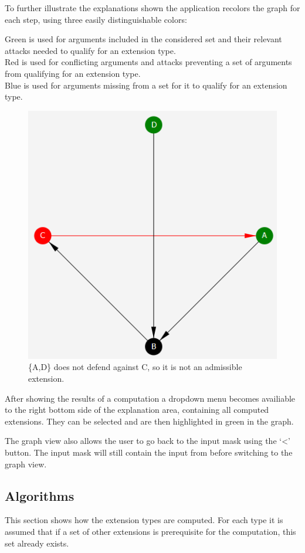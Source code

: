 \documentclass[draft,final]{vutinfth} %
\newcommand{\hl}{\par\vspace{6pt}} %
\begin{document}
To further illustrate the explanations shown the application recolors the graph for each step, using three easily distinguishable colors:\hl
Green is used for arguments included in the considered set and their relevant attacks needed to qualify for an extension type.\\
Red is used for conflicting arguments and attacks preventing a set of arguments from qualifying for an extension type.\\
Blue is used for arguments missing from a set for it to qualify for an extension type.\hl

\FloatBarrier
	\begin{figure}[!htb]
		\centering
		\includegraphics{pics/colored.png}
		\caption{\{A,D\} does not defend against C, so it is not an admissible extension.}
	\end{figure}
\FloatBarrier

After showing the results of a computation a dropdown menu becomes availiable to the right bottom side of the explanation area, containing all computed extensions. They can be selected and are then highlighted in green in the graph.\hl
The graph view also allows the user to go back to the input mask using the `<' button. The input mask will still contain the input from before switching to the graph view.

\subsection{Algorithms}
This section shows how the extension types are computed. For each type it is assumed that if a set of other extensions is prerequisite for the computation, this set already exists.
\end{document}
